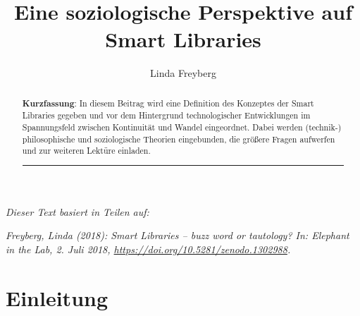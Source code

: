 \documentclass[a4paper,
fontsize=11pt,
oneside,
numbers=noperiodatend,
parskip=half-,
bibliography=totoc,
final
]{scrartcl}
\title{\LARGE{Eine soziologische Perspektive auf Smart Libraries }}%
\author{Linda Freyberg} %
\date{}
\begin{document}
\maketitle
\thispagestyle{fancyplain} 

\begin{abstract}
\noindent
\textbf{Kurzfassung}: In diesem Beitrag wird eine Definition des
Konzeptes der Smart Libraries gegeben und vor dem Hintergrund
technologischer Entwicklungen im Spannungsfeld zwischen Kontinuität und
Wandel eingeordnet. Dabei werden (technik-) philosophische und
soziologische Theorien eingebunden, die größere Fragen aufwerfen und zur
weiteren Lektüre einladen.

\begin{center}\rule{0.5\linewidth}{0.5pt}\end{center}
\end{abstract}

\emph{Dieser Text basiert in Teilen auf:}

\emph{Freyberg, Linda (2018): Smart Libraries -- buzz word or tautology?
In: Elephant in the Lab, 2. Juli 2018,
\url{https://doi.org/10.5281/zenodo.1302988}.}

\hypertarget{einleitung}{%
\section{Einleitung}\label{einleitung}}
\end{document}
